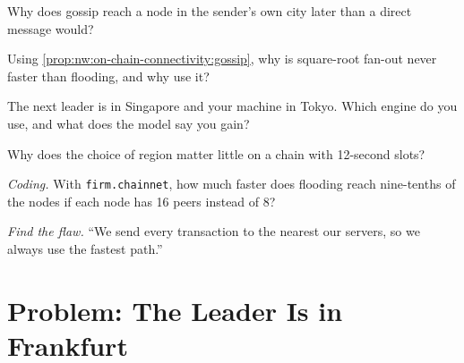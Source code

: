 \begin{exercise}[$\star$]\label{exo:nw:on-chain-connectivity:3}
Why does gossip reach a node in the sender's own city later than a direct message would?
\end{exercise}

\begin{exercise}[$\star\star$]\label{exo:nw:on-chain-connectivity:4}
Using \cref{prop:nw:on-chain-connectivity:gossip}, why is square-root fan-out never faster than flooding, and why use it?
\end{exercise}

\begin{exercise}[$\star\star$]\label{exo:nw:on-chain-connectivity:5}
The next leader is in Singapore and your machine in Tokyo. Which engine do you use, and what does the model say you gain?
\end{exercise}

\begin{exercise}[$\star\star$]\label{exo:nw:on-chain-connectivity:6}
Why does the choice of region matter little on a chain with 12-second slots?
\end{exercise}

\begin{exercise}[$\star\star\star$]\label{exo:nw:on-chain-connectivity:7}
\emph{Coding.} With \texttt{firm.chainnet}, how much faster does flooding reach nine-tenths of the nodes if each node has 16 peers instead of 8?
\end{exercise}

\begin{exercise}[$\star\star\star$]\label{exo:nw:on-chain-connectivity:8}
\emph{Find the flaw.} ``We send every transaction to the  nearest our servers, so we always use the fastest path.''
\end{exercise}

\section{Problem: The Leader Is in Frankfurt}

